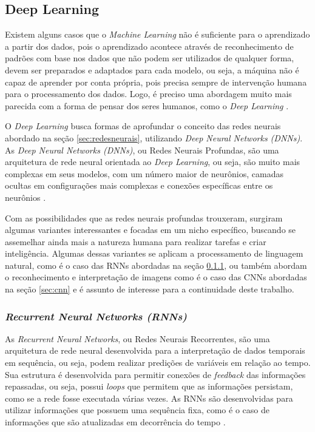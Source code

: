 \subsection{Deep Learning}
Existem alguns casos que o \emph{Machine Learning} não é suficiente para o aprendizado a partir dos dados, pois o aprendizado acontece através de reconhecimento de padrões com base nos dados que não podem ser utilizados de qualquer forma, devem ser preparados e adaptados para cada modelo, ou seja, a máquina não é capaz de aprender por conta própria, pois precisa sempre de intervenção humana para o processamento dos dados. Logo, é preciso uma abordagem muito mais parecida com a forma de pensar dos seres humanos, como o \emph{Deep Learning} \cite{deepLearningPython, deepLearningTensorFlow}.

O \emph{Deep Learning} busca formas de aprofundar o conceito das redes neurais abordado na seção \ref{sec:redesneurais}, utilizando \emph{Deep Neural Networks (DNNs)}. As \emph{Deep Neural Networks (DNNs)}, ou Redes Neurais Profundas, são uma arquitetura de rede neural orientada ao \emph{Deep Learning}, ou seja, são muito mais complexas em seus modelos, com um número maior de neurônios, camadas ocultas em configurações mais complexas e conexões específicas entre os neurônios \cite{deepLearningTensorFlow}.

Com as possibilidades que as redes neurais profundas trouxeram, surgiram algumas variantes interessantes e focadas em um nicho específico, buscando se assemelhar ainda mais a natureza humana para realizar tarefas e criar inteligência. Algumas dessas variantes se aplicam a processamento de linguagem natural, como é o caso das RNNs abordadas na seção \ref{sec:rnn}, ou também abordam o reconhecimento e interpretação de imagens como é o caso das CNNs abordadas na seção \ref{sec:cnn} e é assunto de interesse para a continuidade deste trabalho.

\subsubsection{\emph{Recurrent Neural Networks (RNNs)}}
\label{sec:rnn}
As \emph{Recurrent Neural Networks}, ou Redes Neurais Recorrentes, são uma arquitetura de rede neural desenvolvida para a interpretação de dados temporais em sequência, ou seja, podem realizar predições de variáveis em relação ao tempo. Sua estrutura é desenvolvida para permitir conexões de \emph{feedback} das informações repassadas, ou seja, possui \emph{loops} que permitem que as informações persistam, como se a rede fosse executada várias vezes. As RNNs são desenvolvidas para utilizar informações que possuem uma sequência fixa, como é o caso de informações que são atualizadas em decorrência do tempo \cite{deepLearningTensorFlow}.

